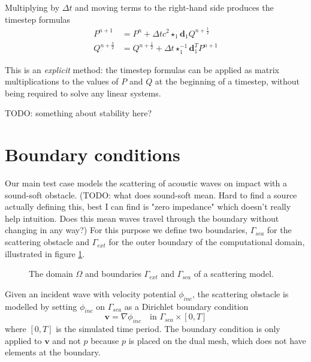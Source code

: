 \documentclass[utf8,english]{gradu3}
\begin{document}
Multiplying by $\Delta t$ and moving terms to the right-hand side
produces the timestep formulas
\begin{align}
  \label{eq:timestep_p}
  P^{n+1} &= P^n + \Delta t c^2 \star_1 \mathbf{d}_1 Q^{n+\frac{1}{2}} \\
  \label{eq:timestep_q}
  Q^{n+\frac{3}{2}} &= Q^{n+\frac{1}{2}} + \Delta t \star_1^{-1} \mathbf{d}_1^T P^{n+1}
\end{align}

This is an \textit{explicit} method:
the timestep formulas can be applied as matrix multiplications
to the values of $P$ and $Q$ at the beginning of a timestep,
without being required to solve any linear systems.

TODO: something about stability here?


\section{Boundary conditions}\label{sec:boundary_conditions}

Our main test case models the scattering of acoustic waves
on impact with a sound-soft obstacle.
(TODO: what does sound-soft mean. Hard to find a source actually defining this,
best I can find is "zero impedance" which doesn't really help intuition.
Does this mean waves travel through the boundary without changing in any way?)
For this purpose we define two boundaries,
$\Gamma_{sca}$ for the scattering obstacle
and $\Gamma_{ext}$ for the outer boundary of the computational domain,
illustrated in figure \ref{fig:scatterer_domain}.

\begin{figure}[h]
  \centering
  \caption{The domain $\Omega$ and boundaries $\Gamma_{ext}$ and $\Gamma_{sca}$
    of a scattering model.}
  \label{fig:scatterer_domain}
\end{figure}

Given an incident wave with velocity potential $\phi_{inc}$,
the scattering obstacle is modelled by setting $\phi_{inc}$ on $\Gamma_{sca}$
as a Dirichlet boundary condition
\begin{equation}
  \mathbf{v} = \nabla \phi_{inc}
  \quad \text{in } \Gamma_{sca} \times [0, T]
\end{equation}
where $[0,T]$ is the simulated time period.
The boundary condition is only applied to $\mathbf{v}$
and not $p$ because $p$ is placed on the dual mesh,
which does not have elements at the boundary.
\end{document}
